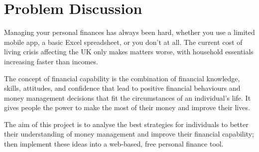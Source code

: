 \section{Problem Discussion}
Managing your personal finances has always been hard, whether you use a limited mobile app, a basic Excel spreadsheet, or you don't at all. The current cost of living crisis affecting the UK only makes matters worse, with household essentials increasing faster than incomes.  

The concept of financial capability is the combination of financial knowledge, skills, attitudes, and confidence that lead to positive financial behaviours and money management decisions that fit the circumstances of an individual's life. It gives people the power to make the most of their money and improve their lives.


The aim of this project is to analyse the best strategies for individuals to better their understanding of money management and improve their financial capability; then implement these ideas into a web-based, free personal finance tool.



